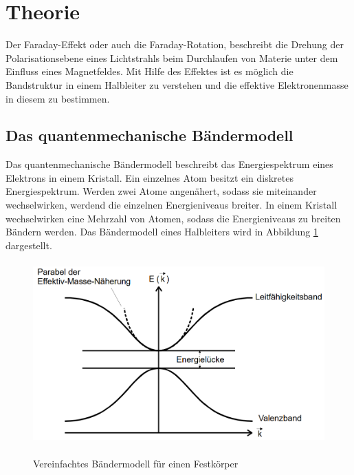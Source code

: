 \section{Theorie}
Der Faraday-Effekt oder auch die Faraday-Rotation, beschreibt die Drehung der
Polarisationsebene eines Lichtstrahls beim Durchlaufen von Materie unter dem
Einfluss eines Magnetfeldes. Mit Hilfe des Effektes ist es möglich die
Bandstruktur in einem Halbleiter zu verstehen und die effektive Elektronenmasse
in diesem zu bestimmen.

\subsection{Das quantenmechanische Bändermodell}
Das quantenmechanische Bändermodell beschreibt das Energiespektrum eines
Elektrons in einem Kristall. Ein einzelnes Atom besitzt ein diskretes
Energiespektrum. Werden zwei Atome angenähert, sodass sie miteinander
wechselwirken, werdend die einzelnen Energieniveaus breiter. In einem Kristall
wechselwirken eine Mehrzahl von Atomen, sodass die Energieniveaus zu breiten
Bändern werden. Das Bändermodell eines Halbleiters wird in Abbildung
\ref{fig:band} dargestellt.

\begin{figure}[H]
  \centering
  \includegraphics[width=13cm, height=7cm]{bandmodel.png}
  \caption{Vereinfachtes Bändermodell für einen Festkörper}
  \label{fig:band}
  \cite{skript}
\end{figure}

